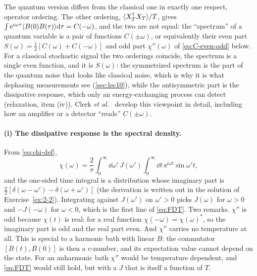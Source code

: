 The quantum version differs from the classical one in exactly one respect, operator ordering.
The other ordering, $\langle X_T^\dagger X_T\rangle/T$, gives $\int\mathrm{e}^{i\omega\tau}\langle B(0)B(\tau)\rangle\mathrm{d}\tau=C(-\omega)$, and the two are not equal: the ``spectrum'' of a quantum variable is a pair of functions $C(\pm\omega)$, or equivalently their even part $S(\omega)=\tfrac12[C(\omega)+C(-\omega)]$ and odd part $\chi''(\omega)$ of \cref{eq:C-even-odd} below.
For a classical stochastic signal the two orderings coincide, the spectrum is a single even function, and it is $S(\omega)$: the symmetrized spectrum is the part of the quantum noise that looks like classical noise, which is why it is what dephasing measurements see (\cref{sec:lec10}), while the antisymmetric part is the dissipative response, which only an energy-exchanging process can detect (relaxation, item (iv)).
Clerk \emph{et al.}~\cite[Sec.~II.A]{ClerkRMP2010} develop this viewpoint in detail, including how an amplifier or a detector ``reads'' $C(\pm\omega)$.

\paragraph{(i) The dissipative response is the spectral density.}
From \cref{eq:chi-def},
\begin{equation*}
  \chi(\omega)=\frac2\pi\int_0^\infty\!\dd\omega'\,J(\omega')\int_0^\infty\!\dd t\,\ee^{i\omega t}\sin\omega't ,
\end{equation*}
and the one-sided time integral is a distribution whose imaginary part is $\tfrac\pi2[\delta(\omega-\omega')-\delta(\omega+\omega')]$ (the derivation is written out in the solution of Exercise~\ref{ex:2-2}).
Integrating against $J(\omega')$ on $\omega'>0$ picks $J(\omega)$ for $\omega>0$ and $-J(-\omega)$ for $\omega<0$, which is the first line of \cref{eq:FDT}.
Two remarks.
$\chi''$ is odd because $\chi(t)$ is real: for a real function $\chi(-\omega)=\chi(\omega)^*$, so the imaginary part is odd and the real part even.
And $\chi''$ carries no temperature at all.
This is special to a harmonic bath with linear $B$: the commutator $[B(t),B(0)]$ is then a c-number, and its expectation value cannot depend on the state.
For an anharmonic bath $\chi''$ would be temperature dependent, and \cref{eq:FDT} would still hold, but with a $J$ that is itself a function of $T$.

